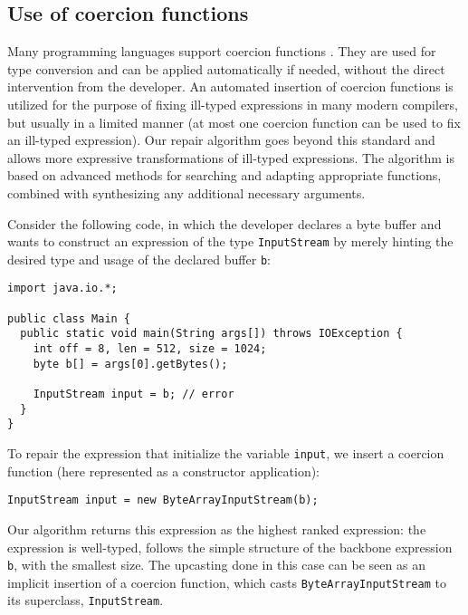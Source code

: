 %

\subsection{Use of coercion functions}

Many programming languages support coercion functions \cite{TannenCoercionS91}. 
They are used for type conversion and can be applied automatically if needed, 
without the direct intervention from the developer. An automated insertion of
coercion functions is utilized for the purpose of fixing ill-typed
expressions in many modern compilers, but usually in a limited manner 
(at most one coercion function can be used to fix an ill-typed expression).
Our repair algorithm goes beyond this standard and allows more expressive transformations of
ill-typed expressions. The algorithm is based on advanced methods for searching and adapting 
appropriate functions, combined with synthesizing any additional necessary
arguments.

Consider the following code, in which the developer declares a byte buffer and
wants to construct an expression of the type \lstinline{InputStream} by merely hinting
the desired type and usage of the declared buffer \lstinline{b}:
\begin{lstlisting}
import java.io.*;

public class Main {
  public static void main(String args[]) throws IOException {
    int off = 8, len = 512, size = 1024;
    byte b[] = args[0].getBytes();
    
    InputStream input = b; // error
  }
}
\end{lstlisting}
To repair the expression that initialize the variable \lstinline{input}, 
we insert a coercion function (here represented as a constructor application):
\begin{lstlisting}    
InputStream input = new ByteArrayInputStream(b);
\end{lstlisting}
Our algorithm returns this expression as the highest ranked expression: 
the expression is well-typed, follows the simple structure of the backbone
expression \lstinline{b}, with the smallest size.
The upcasting done in this case can be seen as an implicit insertion of 
a coercion function, which casts \lstinline{ByteArrayInputStream} to
its superclass, \lstinline{InputStream}.

